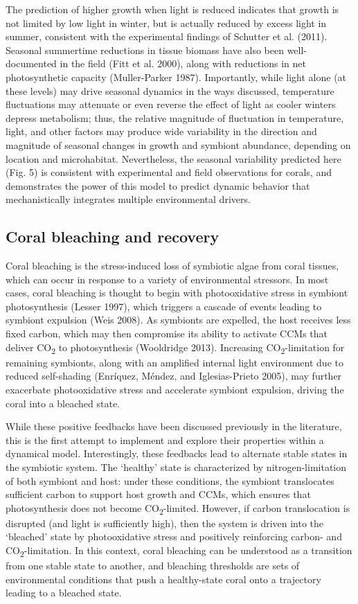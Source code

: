 \documentclass[]{elsarticle} %
\begin{document}
The prediction of higher growth when light is reduced indicates that
growth is not limited by low light in winter, but is actually reduced by
excess light in summer, consistent with the experimental findings of
Schutter et al. (2011). Seasonal summertime reductions in tissue biomass
have also been well-documented in the field (Fitt et al. 2000), along
with reductions in net photosynthetic capacity (Muller-Parker 1987).
Importantly, while light alone (at these levels) may drive seasonal
dynamics in the ways discussed, temperature fluctuations may attenuate
or even reverse the effect of light as cooler winters depress
metabolism; thus, the relative magnitude of fluctuation in temperature,
light, and other factors may produce wide variability in the direction
and magnitude of seasonal changes in growth and symbiont abundance,
depending on location and microhabitat. Nevertheless, the seasonal
variability predicted here (Fig. 5) is consistent with experimental and
field observations for corals, and demonstrates the power of this model
to predict dynamic behavior that mechanistically integrates multiple
environmental drivers.

\subsection{Coral bleaching and
recovery}\label{coral-bleaching-and-recovery}

Coral bleaching is the stress-induced loss of symbiotic algae from coral
tissues, which can occur in response to a variety of environmental
stressors. In most cases, coral bleaching is thought to begin with
photooxidative stress in symbiont photosynthesis (Lesser 1997), which
triggers a cascade of events leading to symbiont expulsion (Weis 2008).
As symbionts are expelled, the host receives less fixed carbon, which
may then compromise its ability to activate CCMs that deliver
CO\textsubscript{2} to photosynthesis (Wooldridge 2013). Increasing
CO\textsubscript{2}-limitation for remaining symbionts, along with an
amplified internal light environment due to reduced self-shading
(Enríquez, Méndez, and Iglesias-Prieto 2005), may further exacerbate
photooxidative stress and accelerate symbiont expulsion, driving the
coral into a bleached state.

While these positive feedbacks have been discussed previously in the
literature, this is the first attempt to implement and explore their
properties within a dynamical model. Interestingly, these feedbacks lead
to alternate stable states in the symbiotic system. The `healthy' state
is characterized by nitrogen-limitation of both symbiont and host: under
these conditions, the symbiont translocates sufficient carbon to support
host growth and CCMs, which ensures that photosynthesis does not become
CO\textsubscript{2}-limited. However, if carbon translocation is
disrupted (and light is sufficiently high), then the system is driven
into the `bleached' state by photooxidative stress and positively
reinforcing carbon- and CO\textsubscript{2}-limitation. In this context,
coral bleaching can be understood as a transition from one stable state
to another, and bleaching thresholds are sets of environmental
conditions that push a healthy-state coral onto a trajectory leading to
a bleached state.
\end{document}
